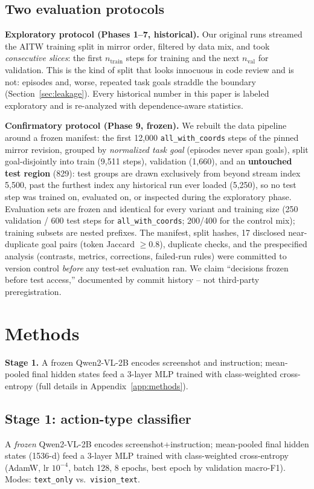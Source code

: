 \else\datasources\fi

\subsection{Two evaluation protocols}
\label{sec:protocols}

\textbf{Exploratory protocol (Phases 1--7, historical).} Our original runs
streamed the AITW training split in mirror order, filtered by data mix, and
took \emph{consecutive slices}: the first $n_{\text{train}}$ steps for
training and the next $n_{\text{val}}$ for validation. This is the kind of
split that looks innocuous in code review and is not: episodes and,
worse, repeated task goals straddle the boundary
(Section~\ref{sec:leakage}). Every historical number in this paper is
labeled exploratory and is re-analyzed with dependence-aware statistics.

\textbf{Confirmatory protocol (Phase 9, frozen).} We rebuilt the data
pipeline around a frozen manifest: the first 12{,}000
\texttt{all\_with\_coords} steps of the pinned mirror revision, grouped by
\emph{normalized task goal} (episodes never span goals), split
goal-disjointly into train (9{,}511 steps), validation (1{,}660), and an
\textbf{untouched test region} (829): test groups are drawn exclusively
from beyond stream index 5{,}500, past the furthest index any historical
run ever loaded (5{,}250), so no test step was trained on, evaluated on,
or inspected during the exploratory phase. Evaluation sets are frozen and
identical for every variant and training size (250 validation / 600 test
steps for \texttt{all\_with\_coords}; 200/400 for the control mix);
training subsets are nested prefixes. The manifest, split hashes, 17
disclosed near-duplicate goal pairs (token Jaccard $\geq 0.8$), duplicate
checks, and the prespecified analysis (contrasts, metrics, corrections,
failed-run rules) were committed to version control \emph{before} any
test-set evaluation ran. We claim ``decisions frozen before test access,''
documented by commit history -- not third-party preregistration.

\section{Methods}

\newcommand{\methstageone}{%
\subsection{Stage 1: action-type classifier}

A \emph{frozen} Qwen2-VL-2B encodes screenshot+instruction; mean-pooled
final hidden states (1536-d) feed a 3-layer MLP trained with
class-weighted cross-entropy (AdamW, lr $10^{-4}$, batch 128, 8 epochs,
best epoch by validation macro-F1). Modes: \texttt{text\_only} vs.\
\texttt{vision\_text}.

}
\ifworkshopbuild \textbf{Stage 1.} A frozen Qwen2-VL-2B encodes screenshot and
instruction; mean-pooled final hidden states feed a 3-layer MLP trained
with class-weighted cross-entropy (full details in
Appendix~\ref{app:methods}).
\else\methstageone\fi

